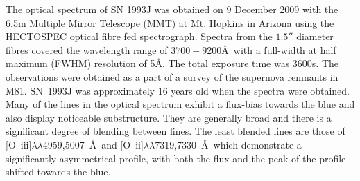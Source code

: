 The optical spectrum of SN 1993J was obtained on 9 December 2009 with the 6.5m Multiple Mirror Telescope (MMT) at Mt. Hopkins in Arizona using the HECTOSPEC optical fibre fed spectrograph. Spectra from the $1.5''$ diameter fibres covered the wavelength range of $3700-9200$\AA\  with a full-width at half maximum (FWHM) resolution of 5\AA.  The total exposure time was 3600s. The observations were obtained as a part of a survey of the supernova remnants in M81.  SN~1993J was approximately 16 years old when the spectra were obtained.  Many of the lines in the optical spectrum exhibit a flux-bias towards the blue and also display noticeable substructure.  They are generally broad and  there is a significant degree of blending between lines.  The least blended lines are those of [O~{\sc iii}]$\lambda\lambda$4959,5007~\AA\ and [O~{\sc ii}]$\lambda\lambda$7319,7330~\AA\ which demonstrate a significantly asymmetrical profile, with both the flux and the peak of the profile shifted towards the blue.

